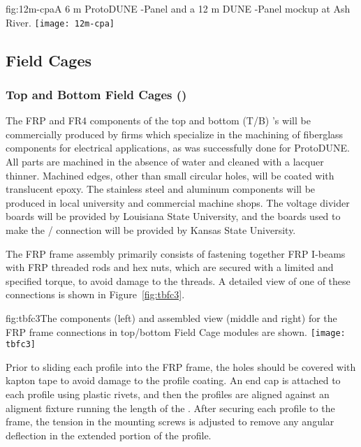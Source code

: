 \begin{dunefigure}{fig:12m-cpa}{A 6 m ProtoDUNE -Panel and a 12 m DUNE -Panel mockup at Ash River.}
\texttt{[image: 12m-cpa]}
\end{dunefigure}

\subsection{Field Cages}
\label{sec:fdsp-hv-prod-fc}



\subsubsection{Top and Bottom Field Cages ()}

The FRP and FR4 components of the top and bottom (T/B) 's will be commercially produced by firms which specialize in the machining of fiberglass components for electrical applications, as was successfully done for ProtoDUNE. All parts are machined in the absence of water and cleaned with a lacquer thinner. Machined edges, other than small circular holes, will be coated with translucent epoxy. The stainless steel and aluminum components will be produced in local university and commercial machine shops. The voltage divider boards will be provided by Louisiana State University, and the boards used to make the / connection will be provided by Kansas State University.

The FRP frame assembly primarily consists of fastening together FRP I-beams with FRP threaded rods and hex nuts, which are secured with a limited and specified torque, to avoid damage to the threads. A detailed view of one of these connections is shown in Figure~\ref{fig:tbfc3}.

\begin{dunefigure}{fig:tbfc3}{The components (left) and assembled view (middle and right) for the FRP frame connections in top/bottom Field Cage modules are shown.}
\texttt{[image: tbfc3]}
\end{dunefigure}

Prior to sliding each profile into the FRP frame, the holes should be covered with kapton tape to avoid damage to the profile coating. An end cap is attached to each profile using plastic rivets, and then the profiles are aligned against an aligment fixture running the length of the . After securing each profile to the frame, the tension in the mounting screws is adjusted to remove any angular deflection in the extended portion of the profile.

